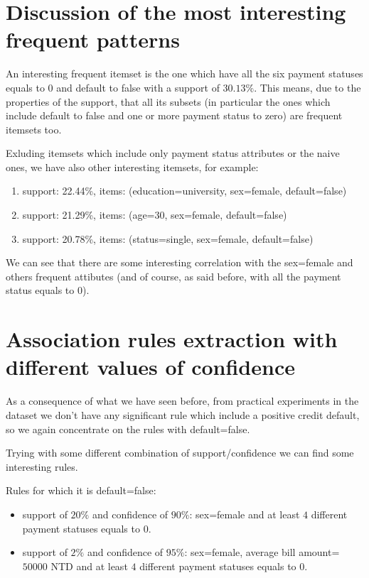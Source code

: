 \section{Discussion of the most interesting frequent patterns}

An interesting frequent itemset is the one which have all the six payment statuses equals to $0$ and default to false with a support of $30.13\%$. This means, due to the properties of the support, that all its subsets (in particular the ones which include default to false and one or more payment status to zero) are frequent itemsets too.

\smallskip

Exluding itemsets which include only payment status attributes or the naive ones, we have also other interesting itemsets, for example:

\begin{enumerate}
  \item support: 22.44\%, items: (education=university, sex=female, default=false)
  \item support: 21.29\%, items: (age=30, sex=female, default=false)
  \item support: 20.78\%, items: (status=single, sex=female, default=false)
\end{enumerate}

We can see that there are some interesting correlation with the sex=female and others frequent attibutes (and of course, as said before, with all the payment status equals to 0).

\section{Association rules extraction with different values of confidence}

As a consequence of what we have seen before, from practical experiments in the dataset we don't have any significant rule which include a positive credit default, so we again concentrate on the rules with default=false.

\medskip

Trying with some different combination of support/confidence we can find some interesting rules.

Rules for which it is default=false:

\begin{itemize}
  \item support of $20\%$ and confidence of $90\%$: 
  sex=female and at least $4$ different payment statuses equals to 0.

  \item support of $2\%$ and confidence of $95\%$: 
  sex=female, average bill amount=$50000$ NTD and at least $4$ different payment statuses equals to 0.

\end{itemize}

